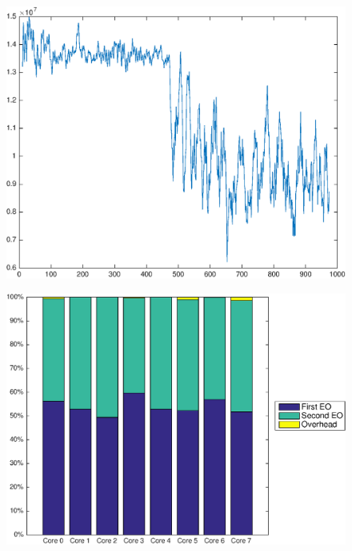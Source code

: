 \documentclass[a4paper,10pt]{article}
\begin{document}
\begin{figure}
    \centering
    \begin{minipage}{0.45\textwidth}
        \centering
        \includegraphics[width=0.99\linewidth]{exp2_cyc.eps}
        \label{fig:cyc_exp2}
    \end{minipage}
    \hfill
    \begin{minipage}{0.45\textwidth}
        \centering
        \includegraphics[width=0.99\linewidth]{exp2_eo.eps}
        \label{fig:eo_exp2}
    \end{minipage}%
\end{figure}
\end{document}

